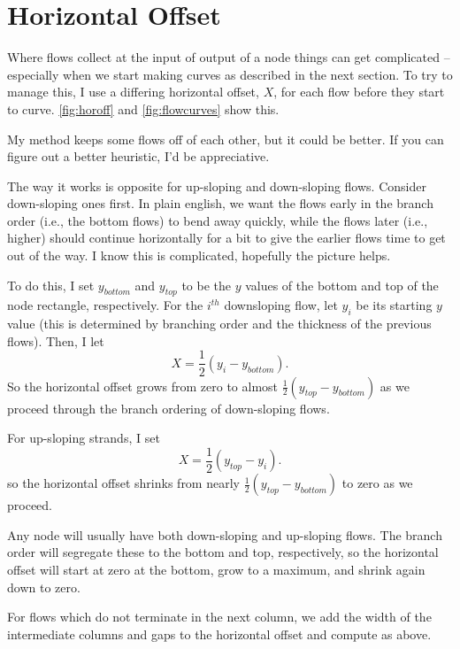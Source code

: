 \documentclass[11pt]{article}
\begin{document}
\section{Horizontal Offset}
Where flows collect at the input of output of a node things can get complicated -- especially when we start making curves as described in the next section.  To try to manage this, I use a differing horizontal offset, $X$, for each flow before they start to curve.  \autoref{fig:horoff} and \autoref{fig:flowcurves} show this. 

My method keeps some flows off of each other, but it could be better.  If you can figure out a better heuristic, I'd be appreciative.

The way it works is opposite for up-sloping and down-sloping flows.  Consider down-sloping ones first.  In plain english, we want the flows early in the branch order (i.e., the bottom flows) to bend away quickly, while the flows later (i.e., higher) should continue horizontally for a bit to give the earlier flows time to get out of the way.  I know this is complicated, hopefully the picture helps.  

To do this, I set $y_{bottom}$ and $y_{top}$ to be the $y$ values of the bottom and top of the node rectangle, respectively.  For the $i^{th}$ downsloping flow, let $y_i$ be its starting $y$ value (this is determined by branching order and the thickness of the previous flows).  Then, I let 
\begin{equation*}
X = \frac{1}{2}\left( y_i - y_{bottom} \right).
\end{equation*}
So the horizontal offset grows from zero to almost $\frac{1}{2}(y_{top} - y_{bottom})$ as we proceed through the branch ordering of down-sloping flows.

For up-sloping strands, I set
\begin{equation*}
X = \frac{1}{2}\left( y_{top} - y_{i} \right).
\end{equation*}
so the horizontal offset shrinks from nearly $\frac{1}{2}(y_{top} - y_{bottom})$ to zero as we proceed.

Any node will usually have both down-sloping and up-sloping flows.  The branch order will segregate these to the bottom and top, respectively, so the horizontal offset will start at zero at the bottom, grow to a maximum, and shrink again down to zero.

For flows which do not terminate in the next column, we add the width of the intermediate columns and gaps to the horizontal offset and compute as above.
\end{document}

